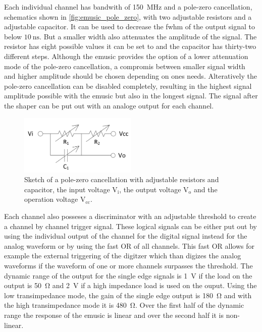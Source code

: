 Each individual channel has bandwith of \SI{150}{\mega\hertz} and a pole-zero cancellation, schematics shown in \autoref{fig:emusic_pole_zero}, with two adjustable resistors and a adjustable capacitor.
It can be used to decrease the \ac{fwhm} of the output signal to below $\SI{10}{\nano\second}$.
But a smaller width also attenuates the amplitude of the signal.
The resistor has eight possible values it can be set to and the capacitor has thirty-two different steps.
Although the \ac{emusic} provides the option of a lower attenuation mode of the pole-zero cancellation, a compromis between smaller signal width and higher amplitude should be chosen depending on ones needs.
Alteratively the pole-zero cancellation can be disabled completely, resulting in the highest signal amplitude possible with the \ac{emusic} but also in the longest signal.
The signal after the shaper can be put out with an analoge output for each channel.
\begin{figure}
	\centering
	\includegraphics[width=0.5\textwidth]{pictures/emusic_pole_zero.png}
	\caption[eMUSIC pole-zero cancellation]{Sketch of a pole-zero cancellation with adjustable resistors and capacitor, the input voltage $\text{V}_\text{i}$, the output voltage $\text{V}_\text{o}$ and the operation voltage $\text{V}_\text{cc}$. \cite{gomez}}
	\label{fig:emusic_pole_zero}
\end{figure}

Each channel also posseses a discriminator with an adjustable threshold to create a channel by channel trigger signal.
These logical signals can be either put out by using the individual output of the channel for the digital signal instead for the analog waveform or by using the fast OR of all channels.
This fast OR allows for example the external triggering of the digitzer which than digizes the analog waveforms if the waveform of one or more channels surpasses the threshold.
The dynamic range of the output for the single edge signals is \SI{1}{\volt} if the load on the output is \SI{50}{\ohm} and \SI{2}{\volt} if a high impedance load is used on the ouput.
Using the low transimpedance mode, the gain of the single edge output is \SI{180}{\ohm} and with the high transimpedance mode it is \SI{480}{\ohm}.
Over the first half of the dynamic range the response of the \ac{emusic} is linear and over the second half it is non-linear.

